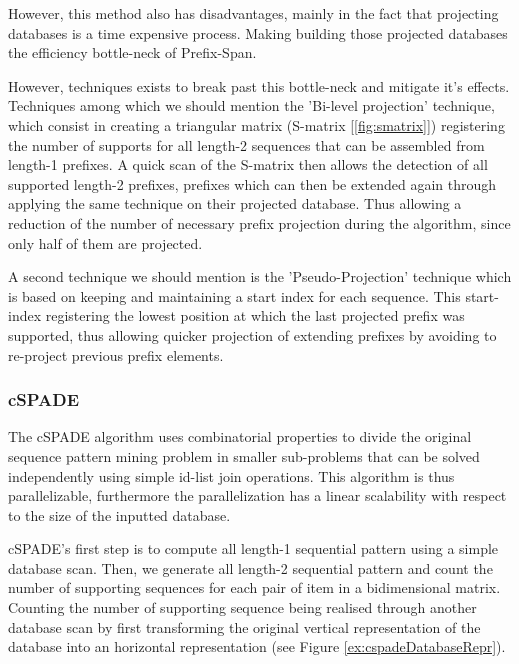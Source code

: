 \documentclass{eplmastersthesis}
\begin{document}
However, this method also has disadvantages, mainly in the fact that projecting databases is a time expensive process. Making building those projected databases the efficiency bottle-neck of Prefix-Span. \newline

However, techniques exists to break past this bottle-neck and mitigate it's effects. Techniques among which we should mention the 'Bi-level projection' technique, which consist in creating a triangular matrix (S-matrix [\ref{fig:smatrix}]) registering the number of supports for all length-2 sequences that can be assembled from length-1 prefixes. A quick scan of the S-matrix then allows the detection of all supported length-2 prefixes, prefixes which can then be extended again through applying the same technique on their projected database. Thus allowing a reduction of the number of necessary prefix projection during the algorithm, since only half of them are projected. \newline

A second technique we should mention is the 'Pseudo-Projection' technique which is based on keeping and maintaining a start index for each sequence. This start-index registering the lowest position at which the last projected prefix was supported, thus allowing quicker projection of extending prefixes by avoiding to re-project previous prefix elements.
\subsubsection{cSPADE}

The cSPADE algorithm \cite{zaki2001spade} uses combinatorial properties to divide the original sequence pattern mining problem in smaller sub-problems that can be solved independently using simple id-list join operations. This algorithm is thus parallelizable, furthermore the parallelization has a linear scalability with respect to the size of the inputted database. \newline

cSPADE's first step is to compute all length-1 sequential pattern using a simple database scan. Then, we generate all length-2 sequential pattern and count the number of supporting sequences for each pair of item in a bidimensional matrix. Counting the number of supporting sequence being realised through another database scan by first transforming the original vertical representation of the database into an horizontal representation (see Figure \ref{ex:cspadeDatabaseRepr}).
\end{document}
